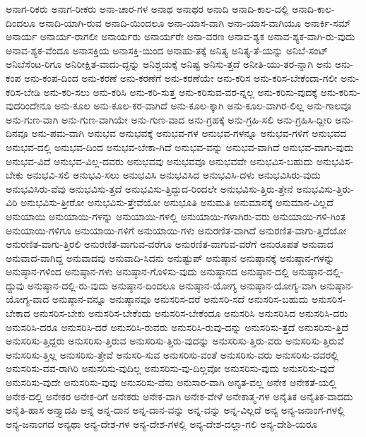 {ಅನಾಗ-ರಿಕರು
ಅನಾಗ-ರೀಕರು
ಅನಾ-ಚಾರ-ಗಳ
ಅನಾಥ
ಅನಾಥರ
ಅನಾದಿ
ಅನಾದಿ-ಕಾಲ-ದಲ್ಲಿ
ಅನಾದಿ-ಕಾಲ-ದಿಂದಲೂ
ಅನಾದಿ-ಯಾಗಿ-ರುವ
ಅನಾದಿ-ಯಿಂದಲೂ
ಅನಾ-ಯಾಸ-ವಾಗಿ
ಅನಾ-ಯಾಸ-ವಾಗಿಯೂ
ಅನಾರ್ಕಿ-ಸಮ್
ಅನಾರ್ಯ
ಅನಾರ್ಯ-ರಾಗಲೀ
ಅನಾರ್ಯರು
ಅನಾರ್ಯರೇ
ಅನಾ-ವರಣ
ಅನಾವ-ಶ್ಯಕ
ಅನಾವ-ಶ್ಯಕ-ವಾಗಿ-ರು-ವುದು
ಅನಾವ-ಶ್ಯಕ-ವೆಂದೂ
ಅನಾಸಕ್ತಿಯ
ಅನಾಸಕ್ತಿ-ಯಿಂದ
ಅನಾಹು-ತಕ್ಕೆ
ಅನಿತ್ಯ
ಅನಿತ್ಯ-ತೆ-ಯನ್ನು
ಅನಿಬೆ-ಸಂಟ್
ಅನಿಬೆಸೆಂಟ-ರಿಗೂ
ಅನಿರೀಕ್ಷಿತ-ವಾದು-ದ್ದನ್ನು
ಅನಿಶ್ಚಯಕ್ಕೆ
ಅನಿಷ್ಟ
ಅನಿಸು-ತ್ತದೆ
ಅನೀತಿ-ಯು-ತರ-ನ್ನಾಗಿ
ಅನು
ಅನು-ಕಂಪ
ಅನು-ಕಂಪ-ದಿಂದ
ಅನು-ಕರಣೆ
ಅನು-ಕರಣೆಗೆ
ಅನು-ಕರಣೆಯೇ
ಅನು-ಕರಿಸ
ಅನು-ಕರಿಸ-ಬೇಕೆಂದಾ-ಗಲೀ
ಅನು-ಕರಿಸ-ಬೇಡಿ
ಅನು-ಕರಿ-ಸಲು
ಅನು-ಕರಿಸಿ
ಅನು-ಕರಿ-ಸುತ್ತ
ಅನು-ಕರಿಸುವ-ವರ-ನ್ನಲ್ಲ
ಅನು-ಕರಿಸು-ವುದಕ್ಕೆ
ಅನು-ಕರಿಸು-ವುದರಿಂದೇನೂ
ಅನು-ಕೂಲ
ಅನು-ಕೂಲ-ಕರ-ವಾಗಿದೆ
ಅನು-ಕೂಲ-ಕ್ಕಾಗಿ
ಅನು-ಕೂಲ-ವಾಗಿರ-ಲಿಲ್ಲ
ಅನು-ಗಾಲವೂ
ಅನು-ಗುಣ-ವಾಗಿ
ಅನು-ಗುಣ-ವಾಗಿಯೇ
ಅನು-ಗುಣ-ವಾದ
ಅನು-ಗ್ರಹಕ್ಕೆ
ಅನು-ಗ್ರಹಿ-ಸಲಿ
ಅನು-ಗ್ರಹಿಸಿ-ದ್ದೀರಿ
ಅನು-ದಿನವೂ
ಅನು-ಪಮ-ವಾಗಿ
ಅನುಭವ
ಅನುಭವಕ್ಕೆ
ಅನುಭವ-ಗಳ
ಅನುಭವ-ಗಳನ್ನೂ
ಅನುಭವ-ಗಳಿಗೆ
ಅನುಭವದ
ಅನುಭವ-ದಲ್ಲಿ
ಅನುಭವ-ದಿಂದ
ಅನುಭವ-ಬೇಕಾ-ಗಿದೆ
ಅನುಭವ-ವನ್ನು
ಅನುಭವ-ವಾಗಿದೆ
ಅನುಭವ-ವಾಗು-ವುದು
ಅನುಭವ-ವಿದೆ
ಅನುಭವ-ವಿಲ್ಲ-ದವರು
ಅನುಭವವು
ಅನುಭವವೂ
ಅನುಭವವೇ
ಅನುಭವಿಸ-ಬಹುದು
ಅನುಭವಿಸ-ಬೇಕು
ಅನುಭವಿ-ಸಲಿ
ಅನುಭವಿ-ಸಲು
ಅನುಭವಿಸಿ
ಅನುಭವಿಸಿದ
ಅನುಭವಿಸಿ-ದಳು
ಅನುಭವಿಸಿರು-ವುದು
ಅನುಭವಿಸಿರು-ವೆವು
ಅನುಭವಿಸು-ತ್ತದೆ
ಅನುಭವಿಸು-ತ್ತಿದ್ದುದ-ರಿಂದಲೇ
ಅನುಭವಿಸು-ತ್ತಿರು-ತ್ತೇನೆ
ಅನುಭವಿಸು-ತ್ತಿರು-ವಿರಿ
ಅನುಭವಿಸು-ತ್ತೀರೋ
ಅನುಭವಿಸು-ತ್ತೇವೆಯೋ
ಅನುಭೂತಿ
ಅನುಮತಿ
ಅನುಮಾನಕ್ಕೆ
ಅನುಮಾನ-ವಿಲ್ಲದೆ
ಅನುಯಾಯಿ
ಅನುಯಾಯಿ-ಗಳನ್ನು
ಅನುಯಾಯಿ-ಗಳಲ್ಲಿ
ಅನುಯಾಯಿ-ಗಳಾಗಿರು-ವರು
ಅನುಯಾಯಿ-ಗಳಿ-ಗಿಂತ
ಅನುಯಾಯಿ-ಗಳಿಗೂ
ಅನುಯಾಯಿ-ಗಳಿಗೆ
ಅನುಯಾಯಿ-ಗಳು
ಅನುರಣಿತ-ವಾಗಿದೆ
ಅನುರಣಿತ-ವಾಗು-ತ್ತಿದೆಯೋ
ಅನುರಣಿತ-ವಾಗು-ತ್ತಿರಲಿ
ಅನುರಣಿತ-ವಾಗುವ-ವರೆಗೂ
ಅನುರಣಿತ-ವಾಗುವ-ವರೆಗೆ
ಅನುರೂಪತೆ
ಅನುವಾದ
ಅನುವಾದ-ವಾಗಿದ್ದ
ಅನುವಾದವು
ಅನುವಾದಿ-ಸಿದನು
ಅನುಷ್ಟುಪ್
ಅನುಷ್ಠಾನ
ಅನುಷ್ಠಾನಕ್ಕೆ
ಅನುಷ್ಠಾನ-ಗಳನ್ನು
ಅನುಷ್ಠಾನ-ಗಳಿಂದ
ಅನುಷ್ಠಾನ-ಗಳು
ಅನುಷ್ಠಾನ-ಗೊಳಿಸು-ವುದು
ಅನುಷ್ಠಾನದ
ಅನುಷ್ಠಾನ-ದಲ್ಲಿ
ಅನುಷ್ಠಾನ-ದಲ್ಲಿ-ದ್ದುವು
ಅನುಷ್ಠಾನ-ದಲ್ಲಿ-ರು-ವುದು
ಅನುಷ್ಠಾನ-ದಿಂದಲೂ
ಅನುಷ್ಠಾನ-ಯೋಗ್ಯ
ಅನುಷ್ಠಾನ-ಯೋಗ್ಯ-ವಾಗಿ
ಅನುಷ್ಠಾನ-ಯೋಗ್ಯ-ವಾದ
ಅನುಷ್ಠಾನ-ವನ್ನೂ
ಅನುಷ್ಠಾನವೂ
ಅನುಸರಿಸ-ದರೆ
ಅನುಸರಿ-ಸದೆ
ಅನುಸರಿಸ-ಬಹುದು
ಅನುಸರಿಸ-ಬೇಕಾದ
ಅನುಸರಿಸ-ಬೇಕು
ಅನುಸರಿಸ-ಬೇಕೆಂದು
ಅನುಸರಿಸ-ಬೇಕೆಂದೂ
ಅನುಸರಿಸಿ
ಅನುಸರಿಸಿದ
ಅನುಸರಿಸಿ-ದರು
ಅನುಸರಿಸಿ-ದರೂ
ಅನುಸರಿಸಿ-ದರೆ
ಅನುಸರಿಸಿ-ರುವರು
ಅನುಸರಿಸಿ-ರುವು-ದನ್ನು
ಅನುಸರಿಸು-ತ್ತದೆ
ಅನುಸರಿಸು-ತ್ತಿದೆ
ಅನುಸರಿಸು-ತ್ತಿದ್ದರು
ಅನುಸರಿಸು-ತ್ತಿರುವ
ಅನುಸರಿಸು-ತ್ತಿರು-ವುದನ್ನು
ಅನುಸರಿಸು-ತ್ತಿರು-ವರು
ಅನುಸರಿಸು-ತ್ತಿರುವೆ
ಅನುಸರಿಸು-ತ್ತಿಲ್ಲ
ಅನುಸರಿಸು-ತ್ತೇವೆ
ಅನುಸರಿ-ಸುವ
ಅನುಸರಿಸು-ವಂತೆ
ಅನುಸರಿಸು-ವರು
ಅನುಸರಿಸು-ವವರಲ್ಲಿ
ಅನುಸರಿಸು-ವವ-ರಾಗಿರಿ
ಅನುಸರಿಸು-ವುದಿಲ್ಲ
ಅನುಸರಿಸು-ವು-ದಿಲ್ಲವೋ
ಅನುಸರಿಸು-ವುದು
ಅನುಸರಿಸು-ವುದೆ
ಅನುಸರಿಸು-ವುದೇ
ಅನುಸರಿಸು-ವುವು
ಅನುಸರಿಸು-ವೆನು
ಅನುಸಾರ-ವಾಗಿ
ಅನೃತ-ವಲ್ಲ
ಅನೇಕ
ಅನೇಕತೆ-ಯಲ್ಲಿ
ಅನೇಕ-ದಲ್ಲಿ
ಅನೇಕರ
ಅನೇಕ-ರಿಗೆ
ಅನೇಕರು
ಅನೇಕ-ವಾಗಿ
ಅನೇಕ-ವೇಳೆ
ಅನೇಕಾತ್ಮ-ಗಳ
ಅನೈತಿಕ
ಅನೈತಿಕ-ವಾದದು
ಅನೈತಿ-ಹಾಸ
ಅನ್ತ್ಯಾದಪಿ
ಅನ್ನ
ಅನ್ನ-ದಾನ
ಅನ್ನ-ದಾನ-ವನ್ನು
ಅನ್ನ-ವನ್ನು
ಅನ್ನ-ವಿಲ್ಲದೆ
ಅನ್ಯ
ಅನ್ಯ-ಜನಾಂಗ-ಗಳಲ್ಲಿ
ಅನ್ಯ-ಜನಾಂಗದ
ಅನ್ಯಥಾ
ಅನ್ಯ-ದೇಶ-ಗಳ
ಅನ್ಯ-ದೇಶ-ಗಳಲ್ಲಿ
ಅನ್ಯ-ದೇಶ-ದಲ್ಲಾ-ಗಲಿ
ಅನ್ಯ-ದೇಶಿ-ಯರೂ
}
